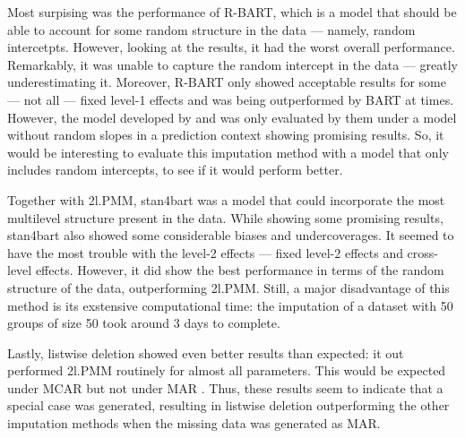 \documentclass[preprint,12pt]{elsarticle}
\begin{document}
Most surpising was the performance of R-BART, which is a model that should be able to account for some random structure in the data --- namely, random intercetpts. However, looking at the results, it had the worst overall performance. Remarkably, it was unable to capture the random intercept in the data --- greatly underestimating it. Moreover, R-BART only showed acceptable results for some --- not all --- fixed level-1 effects and was being outperformed by BART at times. However, the model developed by \citet{wagner2020,tan2016} and \citet{dorie2024} was only evaluated by them under a model without random slopes in a prediction context showing promising results. So, it would be interesting to evaluate this imputation method with a model that only includes random intercepts, to see if it would perform better. %

Together with 2l.PMM, stan4bart was a model that could incorporate the most multilevel structure present in the data. While showing some promising results, stan4bart also showed some considerable biases and undercoverages. It seemed to have the most trouble with the level-2 effects --- fixed level-2 effects and cross-level effects. However, it did show the best performance in terms of the random structure of the data, outperforming 2l.PMM. Still, a major disadvantage of this method is its exstensive computational time: the imputation of a dataset with 50 groups of size 50 took around 3 days to complete. %

Lastly, listwise deletion showed even better results than expected: it out performed 2l.PMM routinely for almost all parameters. This would be expected under MCAR but not under MAR \citep{buurenFlexibleImputationMissing2018,enders2018a,peeters2015,austin2021,carpenter2013,little2002,grund2018,ludtke2017,grund2021,schouten2021}. Thus, these results seem to indicate that a special case was generated, resulting in listwise deletion outperforming the other imputation methods when the missing data was generated as MAR. %
\end{document}
